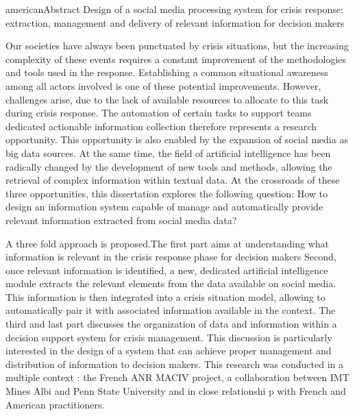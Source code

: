 {american}{Abstract}%
{Design of a social media processing system for crisis response: extraction, management and delivery of relevant information for decision makers}%
{
  Our societies have always been punctuated by crisis situations, but the increasing
  complexity of these events requires a constant improvement of the methodologies and tools used in the response.
  Establishing a common situational awareness among all actors involved is one of these potential improvements.
  However, challenges arise, due to the lack of available resources to allocate to this task during crisis response.
  The automation of certain tasks to support teams dedicated actionable information collection therefore represents a research opportunity.
  This opportunity is also enabled by the expansion of social media as big data sources.
  At the same time, the field of artificial intelligence has been radically changed by the development
  of new tools and methods, allowing the retrieval of complex information within textual data.
  At the crossroads of these three opportunities, this dissertation explores the following question:
  How to design an information system capable of manage and automatically provide relevant information extracted from social media data?

  A three fold approach is proposed.The first part aims at understanding what information is relevant in the crisis response phase for decision makers
  Second, once relevant information is identified, a new, dedicated artificial intelligence
  module extracts the relevant elements from the data available on social media.
  This information is then integrated into a crisis situation model, allowing to automatically
  pair it with associated information available in the context.
  The third and last part discusses the organization of data and information within a decision support system for crisis management.
  This discussion is particularly interested in the design of a system that can achieve
  proper management and distribution of information to decision makers.
  This research was conducted in a multiple context : the French ANR MACIV project, a collaboration
  between IMT Mines Albi and Penn State University and in close relationshi p with French and American practitioners.

}

